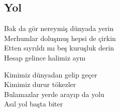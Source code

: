 \subsection{Yol}

Bak da gör nereymiş dünyada yerin \\
Merhumlar doluşmuş hepsi de çirkin \\
Etten sıyrıldı mı beş kuruşluk derin \\
Hesap gelince halimiz aynı

\noindent\newline
Kimimiz dünyadan gelip geçer \\
Kimimiz durur tökezler \\
Bulamazlar yerde arayıp da yolu \\
Asıl yol başta biter